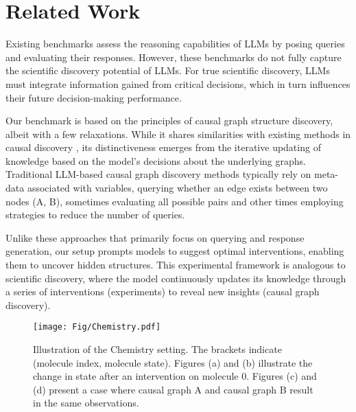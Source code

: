 \section{Related Work}
Existing benchmarks \cite{ASDiv,GSM8K,SVAMP,mawps}  assess the reasoning capabilities of LLMs by posing queries and evaluating their responses. However, these benchmarks do not fully capture the scientific discovery potential of LLMs. For true scientific discovery, LLMs must integrate information gained from critical decisions, which in turn influences their future decision-making performance. 

Our benchmark is based on the principles of causal graph structure discovery, albeit with a few relaxations. While it shares similarities with existing methods in causal discovery \cite{jiralerspong2024efficient,long2023can,choi2022lmpriors,kiciman2023causal}, its distinctiveness emerges from the iterative updating of knowledge based on the model's decisions about the underlying graphs. Traditional LLM-based causal graph discovery methods typically rely on meta-data associated with variables, querying whether an edge exists between two nodes (A, B), sometimes evaluating all possible pairs and other times employing strategies to reduce the number of queries. 

Unlike these approaches that primarily focus on querying and response generation, our setup prompts models to suggest optimal interventions, enabling them to uncover hidden structures. This experimental framework is analogous to scientific discovery, where the model continuously updates its knowledge through a series of interventions (experiments) to reveal new insights (causal graph discovery).

\begin{figure}[t]
\centering
{\texttt{[image: Fig/Chemistry.pdf]}
}\\
\caption{Illustration of the Chemistry setting. The brackets indicate (molecule index, molecule state). Figures (a) and (b) illustrate the change in state after an intervention on molecule 0. Figures (c) and (d) present a case where causal graph A and causal graph B result in the same observations.}
\label{Chemistry}
\end{figure}
